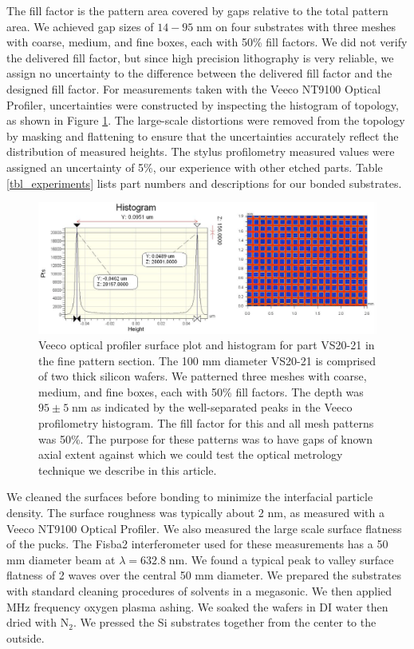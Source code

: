 The fill factor is the pattern area covered by gaps relative to the total pattern area.  We achieved gap sizes of $14-95\;$nm on four substrates with three meshes with coarse, medium, and fine boxes, each with 50\% fill factors.  We did not verify the delivered fill factor, but since high precision lithography is very reliable, we assign no uncertainty to the difference between the delivered fill factor and the designed fill factor.  For measurements taken with the Veeco NT9100 Optical Profiler, uncertainties were constructed by inspecting the histogram of topology, as shown in Figure \ref{figVS20pattern}.  The large-scale distortions were removed from the topology by masking and flattening to ensure that the uncertainties accurately reflect the distribution of measured heights.  The stylus profilometry measured values were assigned an uncertainty of 5\%, our experience with other etched parts.  Table \ref{tbl_experiments} lists part numbers and descriptions for our bonded substrates.

\begin{figure}[htbp]
\includegraphics[width=1.0\columnwidth]{chSiGaps/figs/VS20fineGapCrop.pdf}
\caption{
\label{figVS20pattern}
Veeco optical profiler surface plot and histogram for part VS20-21 in the fine pattern section.  The 100 mm diameter VS20-21 is comprised of two thick silicon wafers.  We patterned three meshes with coarse, medium, and fine boxes, each with 50\% fill factors.  The depth was $95 \pm 5\;$nm as indicated by the well-separated peaks in the Veeco profilometry histogram.  The fill factor for this and all mesh patterns was 50\%.  The purpose for these patterns was to have gaps of known axial extent against which we could test the optical metrology technique we describe in this article.}
\end{figure}





We cleaned the surfaces before bonding to minimize the interfacial particle density.  The surface roughness was typically about 2 nm, as measured with a Veeco NT9100 Optical Profiler.  We also measured the large scale surface flatness of the pucks.  The Fisba2 interferometer used for these measurements has a 50 mm diameter beam at $\lambda=632.8\;$nm.  We found a typical peak to valley surface flatness of 2 waves over the central 50 mm diameter.  We prepared the substrates with standard cleaning procedures of solvents in a megasonic.  We then applied MHz frequency oxygen plasma ashing.  We soaked the wafers in DI water then dried with N$_2$.  We pressed the Si substrates together from the center to the outside.

